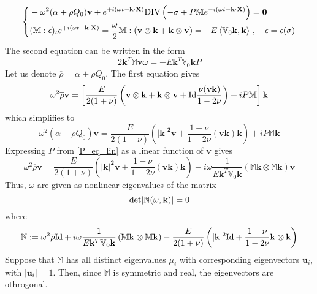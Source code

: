 \documentclass[12pt]{article}
\numberwithin{theorem}{section}
\begin{document}
\[
\left\{ 
\begin{aligned} 
& -\omega^2(\alpha+ \rho Q_0)\mathbf{v} +  e^{+i(\omega t - \mathbf{k\cdot X})} {\rm DIV} \left( - \sigma+ P \mathbb{M}e^{-i(\omega t - \mathbf{k\cdot X})}  \right) =\mathbf{0}
\\ 
& (\mathbb{M}: \epsilon)_t e^{+i(\omega t - \mathbf{k\cdot X})} =\frac{\omega}{2}\mathbb{M}:(\mathbf{v\otimes k + k\otimes v})= -  E \left< \mathbb{V}_0 \mathbf{k}, \mathbf{k} \right>  \, , 
\quad \epsilon = \epsilon(\sigma) 
\end{aligned}  
\right. 
\]
The second equation can be written in the form 
\begin{equation} 
\label{P_eq_lin}
2 \mathbf{k}^T\mathbb{M}\mathbf{v} \omega = 
-E \mathbf{k}^T\mathbb{V}_0\mathbf{k} P 
\end{equation}
Let us denote $\overline{\rho}=\alpha+ \rho Q_0$. 
The first equation gives
\begin{equation} 
\label{v_P_eq_init} 
\omega^2 \overline{\rho}\mathbf{v} =
\left[\frac{E}{2(1+\nu)}\left(\mathbf{v\otimes k + k\otimes v} + {\rm Id}\frac{\nu( \mathbf{vk})}{1-2\nu} \right)+iP\mathbb{M}\right]\mathbf{k}
\end{equation} 
which simplifies to 
\begin{equation} 
\label{omega_P_eq} 
\omega^2(\alpha+ \rho Q_0)\mathbf{v} =
\frac{E}{2(1+\nu)}\left(\mathbf{|k|^2v} + \frac{1-\nu}{1-2\nu}\mathbf{(vk)k} \right)+iP\mathbb{M}\mathbf{k}
\end{equation} 
Expressing $P$ from \eqref{P_eq_lin} as a linear function of $\mathbf{v}$ gives 
\begin{equation} 
\omega^2 \overline{\rho} \mathbf{v} =
\frac{E}{2(1+\nu)}\left(\mathbf{|k|^2v} + \frac{1-\nu}{1-2\nu}\mathbf{(vk)k} \right)
-i \omega \frac{1}{ E \mathbf{k}^T\mathbb{V}_0\mathbf{k}}
\left( \mathbb{M}\mathbf{k}\otimes \mathbb{M}\mathbf{k} \right)  \mathbf{v} 
\end{equation} 
Thus, $\omega$ are given as nonlinear eigenvalues of the matrix 
\begin{equation} 
{\rm det}| 
\mathbb{N} (\omega, \mathbf{k} ) | =0 
\label{disp_eq} 
\end{equation} 
where 
\begin{equation}
\mathbb{N}:= 
\omega^2 \overline{\rho} {\rm Id} 
+i \omega 
\frac{1}{ E \mathbf{k}^T\mathbb{V}_0\mathbf{k}}
\left( \mathbb{M}\mathbf{k}\otimes \mathbb{M}\mathbf{k} \right)
-
\frac{E}{2(1+\nu)}\left( 
|\mathbf{k}|^2 {\rm Id} 
+ 
\frac{1-\nu}{1- 2 \nu} \mathbf{k} \otimes \mathbf{k} 
\right) 
\label{N_eq} 
\end{equation}
Suppose that $\mathbb{M}$ has all distinct eigenvalues $\mu_i$ with corresponding eigenvectors $\mathbf{u}_i$, with $|\mathbf{u}_i|=1$. Then, since $\mathbb{M}$ is symmetric and real, the eigenvectors are othrogonal. 
\end{document}
